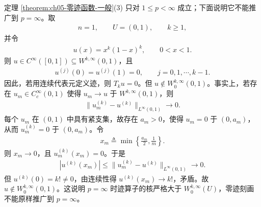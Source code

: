 \begin{remark}[$p=\infty$ 时零迹刻画失效]\label{remark:ch05-pinfty零迹反例}
定理 \ref{theorem:ch05-零迹函数-一般}(3) 只对 $1\leqslant p<\infty$ 成立；下面说明它不能推广到 $p=\infty$。取
\begin{align*}
n=1,
\qquad
U=(0,1),
\qquad
k\geqslant1,
\end{align*}
并令
\begin{align*}
u(x)=x^{k}(1-x)^{k},
\qquad 0<x<1.
\end{align*}
则 $u\in C^{\infty}([0,1])\subseteq W^{k,\infty}(0,1)$，且
\begin{align*}
u^{(j)}(0)=u^{(j)}(1)=0,
\qquad j=0,1,\cdots,k-1.
\end{align*}
因此，若用连续代表元定义迹，则 $T_{k}u=0$。但 $u\notin W^{k,\infty}_{0}(0,1)$。事实上，若存在 $u_{m}\in C^{\infty}_{c}(0,1)$ 使得 $u_{m}\to u$ 于 $W^{k,\infty}(0,1)$，则
\begin{align*}
\|u_{m}^{(k)}-u^{(k)}\|_{L^{\infty}(0,1)}
\longrightarrow0.
\end{align*}
每个 $u_{m}$ 在 $(0,1)$ 中具有紧支集，故存在 $a_{m}>0$，使得 $u_{m}=0$ 于 $(0,a_{m})$，从而 $u_{m}^{(k)}=0$ 于 $(0,a_{m})$。令
\begin{align*}
x_{m}\triangleq\min\left\{\frac{a_{m}}{2},\frac{1}{m}\right\}.
\end{align*}
则 $x_{m}\to0$，且 $u_{m}^{(k)}(x_{m})=0$。于是
\begin{align*}
|u^{(k)}(x_{m})|
\leqslant
\|u_{m}^{(k)}-u^{(k)}\|_{L^{\infty}(0,1)}
\longrightarrow0.
\end{align*}
但 $u^{(k)}(0)=k!\neq0$，由连续性得 $u^{(k)}(x_{m})\to k!$，矛盾。故 $u\notin W^{k,\infty}_{0}(0,1)$。这说明 $p=\infty$ 时迹算子的核严格大于 $W^{k,\infty}_{0}(U)$，零迹刻画不能原样推广到 $p=\infty$。
\end{remark}
